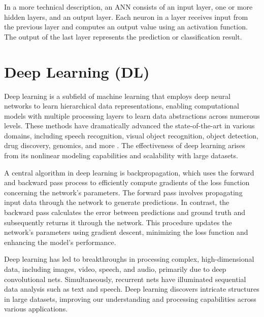 



In a more technical description, an ANN consists of an input layer, one or more hidden layers, and an output layer. Each neuron in a layer receives input from the previous layer and computes an output value using an activation function. The output of the last layer represents the prediction or classification result.





\section{Deep Learning (DL)}


Deep learning is a subfield of machine learning that employs deep neural networks to learn hierarchical data representations, enabling computational models with multiple processing layers to learn data abstractions across numerous levels. These methods have dramatically advanced the state-of-the-art in various domains, including speech recognition, visual object recognition, object detection, drug discovery, genomics, and more \cite{LeCun2015DeepLearning}. The effectiveness of deep learning arises from its nonlinear modeling capabilities and scalability with large datasets.

A central algorithm in deep learning is backpropagation, which uses the forward and backward pass process to efficiently compute gradients of the loss function concerning the network's parameters. The forward pass involves propagating input data through the network to generate predictions. In contrast, the backward pass calculates the error between predictions and ground truth and subsequently returns it through the network. This procedure updates the network's parameters using gradient descent, minimizing the loss function and enhancing the model's performance.

Deep learning has led to breakthroughs in processing complex, high-dimensional data, including images, video, speech, and audio, primarily due to deep convolutional nets. Simultaneously, recurrent nets have illuminated sequential data analysis such as text and speech. Deep learning discovers intricate structures in large datasets, improving our understanding and processing capabilities across various applications.

